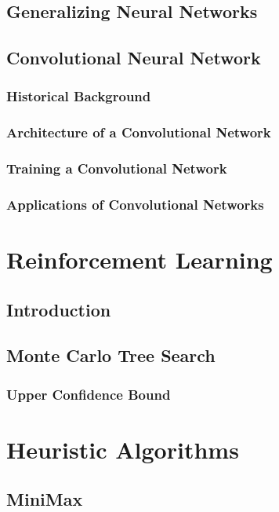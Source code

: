 \documentclass[titlepage]{article}
\begin{document}
\newpage

\subsection{Generalizing Neural Networks}

\newpage

\subsection{Convolutional Neural Network}
\subsubsection{Historical Background}
\subsubsection{Architecture of a Convolutional Network}
\subsubsection{Training a Convolutional Network}
\subsubsection{Applications of Convolutional Networks}

\newpage

\section{Reinforcement Learning}

\newpage

\subsection{Introduction}

\newpage

\subsection{Monte Carlo Tree Search}
\subsubsection{Upper Confidence Bound}

\newpage

\section{Heuristic Algorithms}
\subsection{MiniMax}

\newpage



\end{document}
